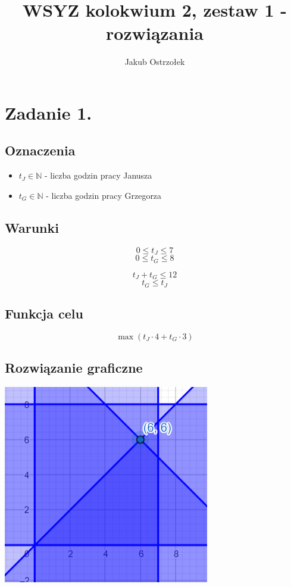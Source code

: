 \documentclass{article}
\title{WSYZ kolokwium 2, zestaw 1 - rozwiązania}
\author{Jakub Ostrzołek}
\begin{document}
\maketitle

\section*{Zadanie 1.}

\subsection*{Oznaczenia}
\begin{itemize}
    \item $t_J \in \mathbb{N}$ - liczba godzin pracy Janusza
    \item $t_G \in \mathbb{N}$ - liczba godzin pracy Grzegorza
\end{itemize}

\subsection*{Warunki}
$$0 \le t_J \le 7$$
$$0 \le t_G \le 8$$

$$t_J + t_G \le 12$$
$$t_G \le t_J$$

\subsection*{Funkcja celu}
$$\max{(t_J \cdot 4 + t_G \cdot 3)}$$

\subsection*{Rozwiązanie graficzne}
\begin{center}
    \includegraphics{zad1.png}
\end{center}
\end{document}

